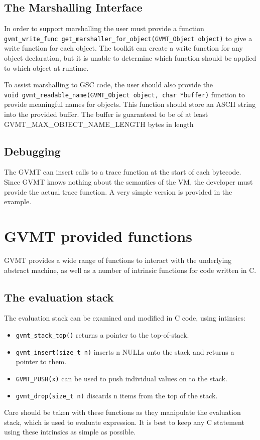 \subsection{The Marshalling Interface}
In order to support marshalling the user must provide a function \\
\verb|gvmt_write_func get_marshaller_for_object(GVMT_Object object)| to give a write function for each object. The toolkit can create a write function for any object declaration, but it is unable to determine which function should be applied to which object at runtime. 

To assist marshalling to GSC code, the user should also provide the \\
\verb|void gvmt_readable_name(GVMT_Object object, char *buffer)| function to provide meaningful names for objects.
This function should store an ASCII string into the provided buffer. The buffer is guaranteed to be of at least GVMT\_MAX\_OBJECT\_NAME\_LENGTH bytes in length 

\subsection{Debugging}
The GVMT can insert calls to a trace function at the start of each bytecode. Since GVMT knows nothing about the semantics of the VM, the developer must provide the actual trace function. A very simple version is provided in the example.

\section{GVMT provided functions}
GVMT provides a wide range of functions to interact with the underlying abstract machine, as well as a number of intrinsic functions for code written in C.

\subsection{The evaluation stack}
The evaluation stack can be examined and modified in C code, using intinsics:
\begin{itemize}
\item \verb|gvmt_stack_top()| returns a pointer to the top-of-stack.
\item \verb|gvmt_insert(size_t n)| inserts n NULLs onto the stack and returns a pointer to them.
\item \verb|GVMT_PUSH(x)| can be used to push individual values on to the stack.
\item \verb|gvmt_drop(size_t n)| discards n items from the top of the stack.
\end{itemize}
Care should be taken with these functions as they manipulate the evaluation stack, which is used to evaluate expression. It is best to keep any C statement using these intrinsics as simple as possible.

